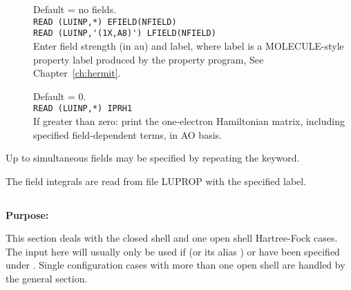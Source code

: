 \begin{description}
\item[]
  Default = no fields. \\
  \verb"READ (LUINP,*) EFIELD(NFIELD)" \\
  \verb"READ (LUINP,'(1X,A8)') LFIELD(NFIELD)" \\
  Enter field strength (in au) and label,
  where label is a MOLE\-CULE-style property label produced
  by the property program, See Chapter~\ref{ch:hermit}.
 
 
\item[]
  Default = 0.\\
  \verb"READ (LUINP,*) IPRH1" \\
  If greater than zero:
  print the one-electron Hamiltonian matrix, including
  specified field-dependent terms, in AO basis.
\end{description}
 
 
Up to \mxfelt simultaneous fields may be specified by repeating the
 keyword.
 
The field integrals are read from file LUPROP with the specified label.


\pagebreak[3]
\subsection{\label{ref-rhfinp}}
 
{\bf Purpose:}
 
This section deals with the closed shell and one open shell
Hartree-Fock cases.  The
input here will usually only be used if 
 (or its alias ) or
 have been
specified under . Single configuration cases with more than one open
shell
are handled by the general  section.

